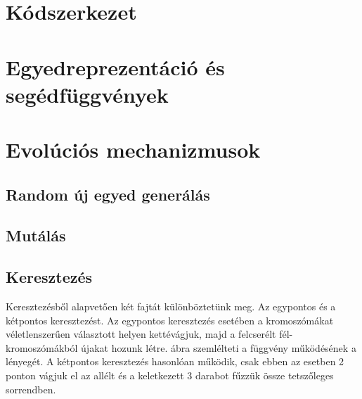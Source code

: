 \documentclass[12ppt,a4paper,oneside]{report}
\begin{document}
    \section{Kódszerkezet} %

    \section{Egyedreprezentáció és segédfüggvények} %

    \section{Evolúciós mechanizmusok} %
        
        \subsection{Random új egyed generálás} %
            
        \subsection{Mutálás} %
            
        \subsection{Keresztezés} %
            
            {Keresztezésből alapvetően két fajtát különböztetünk meg. Az egypontos és a kétpontos keresztezést. Az egypontos keresztezés esetében a kromoszómákat véletlenszerűen választott helyen kettévágjuk, majd a felcserélt fél-kromoszómákból újakat hozunk létre.  ábra szemlélteti a függvény működésének a lényegét. A kétpontos keresztezés hasonlóan működik, csak ebben az esetben 2 ponton vágjuk el az allélt és a keletkezett 3 darabot fűzzük össze tetszőleges sorrendben. }
            
\end{document}
